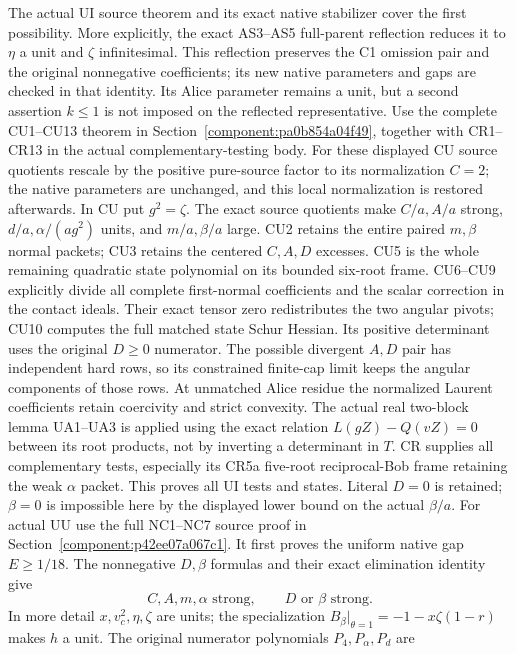 The actual UI source theorem and its exact native stabilizer cover
the first possibility.  More explicitly, the exact AS3--AS5
full-parent reflection reduces it to \(\eta\) a unit and
\(\zeta\) infinitesimal.  This reflection preserves the C1 omission
pair and the original nonnegative coefficients; its new native
parameters and gaps are checked in that identity.  Its Alice
parameter remains a unit, but a second assertion \(k\leq1\) is
not imposed on the reflected representative.
Use the complete CU1--CU13 theorem in
Section~\ref{component:pa0b854a04f49}, together with CR1--CR13 in the actual
complementary-testing body.  For these displayed CU source
quotients rescale by the positive pure-source factor to its
normalization \(C=2\); the native parameters are unchanged,
and this local normalization is restored afterwards.
In CU put \(g^2=\zeta\).
The exact source quotients make \(C/a,A/a\) strong,
\(d/a,\alpha/(ag^2)\) units, and \(m/a,\beta/a\) large.
CU2 retains the entire paired \(m,\beta\) normal packets;
CU3 retains the centered \(C,A,D\) excesses.
CU5 is the whole remaining quadratic state polynomial on
its bounded six-root frame.  CU6--CU9 explicitly divide all
complete first-normal coefficients and the scalar correction in the
contact ideals.  Their exact tensor zero redistributes the
two angular pivots; CU10 computes the full matched state
Schur Hessian.  Its positive determinant uses the original
\(D\geq0\) numerator.  The possible divergent \(A,D\) pair has
independent hard rows, so its constrained finite-cap limit
keeps the angular components of those rows.
At unmatched Alice residue the normalized Laurent coefficients
retain coercivity and strict convexity.  The actual real
two-block lemma UA1--UA3 is applied using the exact relation
\(L(gZ)-Q(vZ)=0\) between its root products, not by inverting
a determinant in \(T\).  CR supplies all complementary tests,
especially its CR5a five-root reciprocal-Bob frame retaining
the weak \(\alpha\) packet.  This proves all UI tests and states.
Literal \(D=0\) is retained; \(\beta=0\) is impossible here by
the displayed lower bound on the actual \(\beta/a\).
For actual UU use the full NC1--NC7 source proof in
Section~\ref{component:p42ee07a067c1}.
It first proves the uniform native gap \(E\geq1/18\).
The nonnegative \(D,\beta\) formulas and their exact elimination
identity give
\[
 C,A,m,\alpha\text{ strong},\qquad
                    D\text{ or }\beta\text{ strong}.
\tag{LC7}
\]
In more detail \(x,v_c^2,\eta,\zeta\) are units; the specialization
\(B_\beta|_{\theta=1}=-1-x\zeta(1-r)\) makes \(h\) a unit.
The original numerator polynomials \(P_4,P_\alpha,P_d\) are
